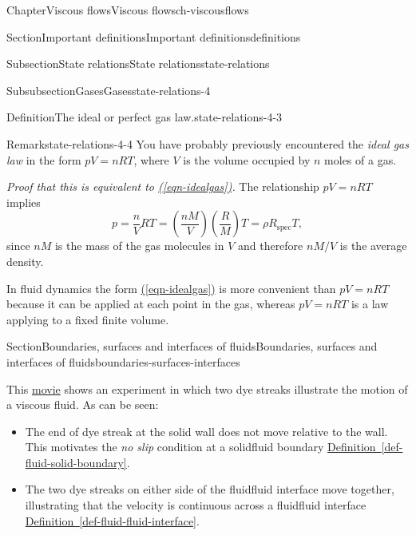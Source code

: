 \documentclass[oneside,10pt,]{book}
\newcommand{\xreffont}{\relax}
\numberwithin{equation}{section}
\begin{document}
\begin{chapterptx}{Chapter}{Viscous flows}{}{Viscous flows}{}{}{ch-viscousflows}
\begin{sectionptx}{Section}{Important definitions}{}{Important definitions}{}{}{definitions}
\begin{subsectionptx}{Subsection}{State relations}{}{State relations}{}{}{state-relations}
\begin{subsubsectionptx}{Subsubsection}{Gases}{}{Gases}{}{}{state-relations-4}
\begin{definition}{Definition}{The ideal or perfect gas law.}{state-relations-4-3}
%
\end{definition}
\begin{remark}{Remark}{}{state-relations-4-4}%
You have probably previously encountered the \emph{ideal gas law} in the form \(pV=nRT\), where \(V\) is the volume occupied by \(n\) moles of a gas.%
\par
\emph{Proof that this is equivalent to \hyperref[eqn-idealgas]{({\xreffont\ref{eqn-idealgas}})}.} The relationship \(pV=nRT\) implies%
\begin{equation*}
p=\frac{n}{V}RT=\left(\frac{nM}{V}\right)\left(\frac{R}{M}\right)T
=\rho R_{\textrm{spec}} T,
\end{equation*}
since \(nM\) is the mass of the gas molecules in \(V\) and therefore \(nM/V\) is the average density.%
\par
In fluid dynamics the form \hyperref[eqn-idealgas]{({\xreffont\ref{eqn-idealgas}})} is more convenient than \(pV=nRT\) because it can be applied at each point in the gas, whereas \(pV=nRT\) is a law applying to a fixed finite volume.%
\end{remark}
\end{subsubsectionptx}
\end{subsectionptx}
\end{sectionptx}
%
%
\typeout{************************************************}
\typeout{************************************************}
%
\begin{sectionptx}{Section}{Boundaries, surfaces and interfaces of fluids}{}{Boundaries, surfaces and interfaces of fluids}{}{}{boundaries-surfaces-interfaces}
\begin{introduction}{}%
This \href{https://www-cambridge-org.ezproxy1.bath.ac.uk/core/homsy/category/118}{movie} shows an experiment in which two dye streaks illustrate the motion of a viscous fluid. As can be seen:%
\begin{itemize}[label=\textbullet]
\item{}The end of dye streak at the solid wall does not move relative to the wall. This motivates the \emph{no slip} condition at a solid\textendash{}fluid boundary \hyperref[def-fluid-solid-boundary]{Definition~{\xreffont\ref{def-fluid-solid-boundary}}}.%
\item{}The two dye streaks on either side of the fluid\textendash{}fluid interface move together, illustrating that the velocity is continuous across a fluid\textendash{}fluid interface \hyperref[def-fluid-fluid-interface]{Definition~{\xreffont\ref{def-fluid-fluid-interface}}}.%

\end{itemize}
\end{introduction}
\end{sectionptx}
\end{chapterptx}
\end{document}
